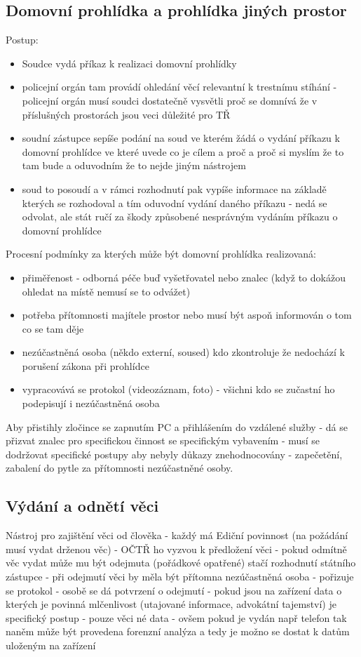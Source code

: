 \subsection{Domovní prohlídka a prohlídka jiných prostor}
Postup:
\begin{itemize}
    \item Soudce vydá příkaz k realizaci domovní prohlídky
    \item  policejní orgán tam provádí ohledání věcí relevantní k trestnímu stíhání - policejní orgán musí soudci dostatečně vysvětli proč se domnívá že v příslušných prostorách jsou veci důležité pro TŘ
    \item soudní zástupce sepíše podání na soud ve kterém žádá o vydání příkazu k domovní prohlídce ve které uvede co je cílem a proč a proč si myslím že to tam bude a oduvodním že to nejde jiným nástrojem
    \item  soud to posoudí a v rámci rozhodnutí pak vypíše informace na základě kterých se rozhodoval a tím oduvodní vydání daného příkazu - nedá se odvolat, ale stát ručí za škody způsobené nesprávným vydáním příkazu o domovní prohlídce
\end{itemize}
Procesní podmínky za kterých může být domovní prohlídka realizovaná:
\begin{itemize}
    \item přiměřenost -  odborná péče buď vyšetřovatel nebo znalec (když to dokážou ohledat na místě nemusí se to odvážet)
    \item potřeba přítomnosti majítele prostor nebo musí být aspoň informován o tom co se tam děje
    \item nezúčastněná osoba (někdo externí, soused) kdo zkontroluje že nedochází k porušení zákona při prohlídce
    \item vypracovává se protokol (videozáznam, foto) - všichni kdo se zučastní ho podepisují i nezúčastněná osoba
\end{itemize}
Aby přistihly zločince se zapnutím PC a přihlášením do vzdálené služby - dá se přizvat znalec pro specifickou
činnost se specifickým vybavením - musí se dodržovat specifické postupy aby nebyly důkazy znehodnocovány - zapečetění, zabalení do pytle za přítomnosti nezúčastněné osoby.

\subsection{Výdání a odnětí věci}
Nástroj pro zajištění věci od člověka - každý má Ediční povinnost (na požádání musí vydat drženou věc) - OČTŘ ho vyzvou k předložení věci - pokud odmítně věc vydat může mu být odejmuta (pořádkové opatřené) stačí rozhodnutí státního zástupce - při odejmutí věci by měla být přítomna nezúčastněná osoba - pořizuje se protokol - osobě se dá potvrzení o odejmutí - pokud jsou na zařízení data o kterých je povinná mlčenlivost (utajované informace, advokátní tajemství) je specifický postup - pouze věci né data - ovšem pokud je vydán např telefon tak naněm může být provedena forenzní analýza a tedy je možno se dostat k datům uloženým na zařízení

